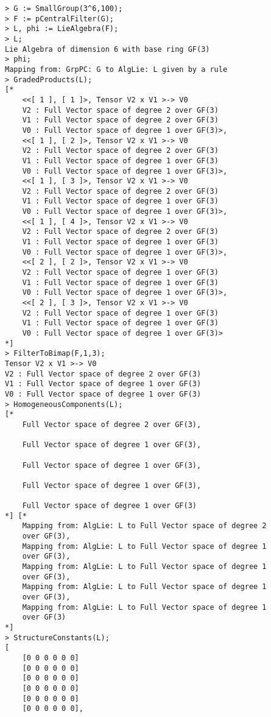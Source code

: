\documentclass{amsart}
\begin{document}
{\small
\begin{lstlisting}[frame=single,basicstyle=\ttfamily\color{black!30!teal},backgroundcolor=\color{white!70!gray}]
> G := SmallGroup(3^6,100);  
> F := pCentralFilter(G);
> L, phi := LieAlgebra(F);
> L;
Lie Algebra of dimension 6 with base ring GF(3)
> phi;
Mapping from: GrpPC: G to AlgLie: L given by a rule
> GradedProducts(L);
[*
    <<[ 1 ], [ 1 ]>, Tensor V2 x V1 >-> V0
    V2 : Full Vector space of degree 2 over GF(3)
    V1 : Full Vector space of degree 2 over GF(3)
    V0 : Full Vector space of degree 1 over GF(3)>,
    <<[ 1 ], [ 2 ]>, Tensor V2 x V1 >-> V0
    V2 : Full Vector space of degree 2 over GF(3)
    V1 : Full Vector space of degree 1 over GF(3)
    V0 : Full Vector space of degree 1 over GF(3)>,
    <<[ 1 ], [ 3 ]>, Tensor V2 x V1 >-> V0
    V2 : Full Vector space of degree 2 over GF(3)
    V1 : Full Vector space of degree 1 over GF(3)
    V0 : Full Vector space of degree 1 over GF(3)>,
    <<[ 1 ], [ 4 ]>, Tensor V2 x V1 >-> V0
    V2 : Full Vector space of degree 2 over GF(3)
    V1 : Full Vector space of degree 1 over GF(3)
    V0 : Full Vector space of degree 1 over GF(3)>,
    <<[ 2 ], [ 2 ]>, Tensor V2 x V1 >-> V0
    V2 : Full Vector space of degree 1 over GF(3)
    V1 : Full Vector space of degree 1 over GF(3)
    V0 : Full Vector space of degree 1 over GF(3)>,
    <<[ 2 ], [ 3 ]>, Tensor V2 x V1 >-> V0
    V2 : Full Vector space of degree 1 over GF(3)
    V1 : Full Vector space of degree 1 over GF(3)
    V0 : Full Vector space of degree 1 over GF(3)>
*]
> FilterToBimap(F,1,3);
Tensor V2 x V1 >-> V0
V2 : Full Vector space of degree 2 over GF(3)
V1 : Full Vector space of degree 1 over GF(3)
V0 : Full Vector space of degree 1 over GF(3)
> HomogeneousComponents(L);
[*
    Full Vector space of degree 2 over GF(3),

    Full Vector space of degree 1 over GF(3),

    Full Vector space of degree 1 over GF(3),

    Full Vector space of degree 1 over GF(3),

    Full Vector space of degree 1 over GF(3)
*] [*
    Mapping from: AlgLie: L to Full Vector space of degree 2 
    over GF(3),
    Mapping from: AlgLie: L to Full Vector space of degree 1 
    over GF(3),
    Mapping from: AlgLie: L to Full Vector space of degree 1 
    over GF(3),
    Mapping from: AlgLie: L to Full Vector space of degree 1 
    over GF(3),
    Mapping from: AlgLie: L to Full Vector space of degree 1 
    over GF(3)
*]
> StructureConstants(L);
[
    [0 0 0 0 0 0]
    [0 0 0 0 0 0]
    [0 0 0 0 0 0]
    [0 0 0 0 0 0]
    [0 0 0 0 0 0]
    [0 0 0 0 0 0],


\end{lstlisting}}
\end{document}
